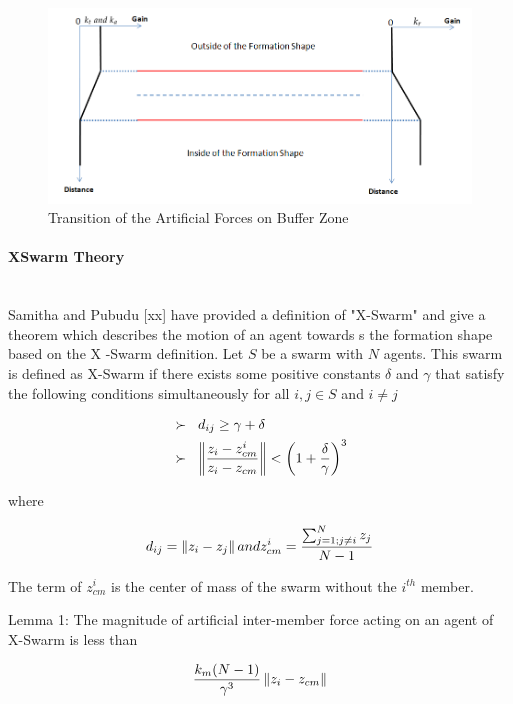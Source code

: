 \begin{figure}[H]
\caption{Transition of the Artificial Forces on Buffer Zone}
\centering
\includegraphics[scale = 0.50]{buffer_zone}
\end{figure}
			
			
\paragraph{XSwarm Theory}\hspace{0pt} \\
Samitha and Pubudu [xx] have provided a definition of "X-Swarm" and give a theorem which describes the motion of an agent towards s the formation shape based on the X -Swarm definition. Let $S$ be a swarm with $N$ agents. This swarm is defined as X-Swarm if there exists some positive constants $\delta$ and  $ \gamma$ that satisfy the following conditions simultaneously for all $i,j \in S$ and $i \neq j$
			
\begin{align*}
&\succ\hspace{0.2cm}  d_{ij} \geq \gamma + \delta \\
&\succ \hspace{0.2cm}   \left\lVert\frac{z_i - z_{cm}^i}{z_i - z_{cm}}\right\rVert < \left(1+\frac{\delta}{\gamma}\right)^3
\end{align*}

where

\begin{equation}
 d_{ij} = \left\lVert z_i - z_j\right\rVert and z_{cm}^i = \frac{\sum_{j=1; j\neq i}^{N} z_j}{N-1}
\end{equation}

The term of $z_{cm}^i$ is the center of mass of the swarm without the $i^{th}$ member.

Lemma 1: The magnitude of artificial inter-member force acting on an agent of X-Swarm  is less than

\begin{equation}
\frac{k_m(N-1)}{\gamma ^3} \left\lVert z_i - z_{cm}\right\rVert
\end{equation}

